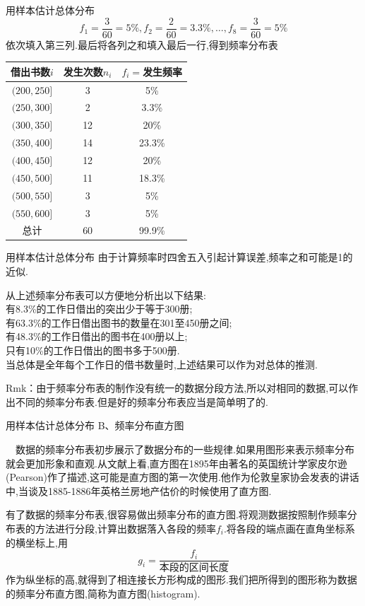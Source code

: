 \begin{frame}{用样本估计总体分布}
\begin{equation*}
f_1 = \frac{3}{60} = 5\%,f_2 =  \frac{2}{60} = 3.3\%,\dots,f_8 =  \frac{3}{60} = 5\%
\end{equation*}
依次填入第三列.最后将各列之和填入最后一行,得到频率分布表

\quad\quad\quad\quad\quad\quad\begin{tabular}{c|c|c}
\hline 借出书数$i$ & 发生次数$n_i$ & $f_i=$发生频率\\
\hline $(200,250]$ & 3 & 5\% \\	
\hline $(250,300]$ & 2 & 3.3\% \\	
\hline $(300,350]$ & 12 & 20\% \\	
\hline $(350,400]$ & 14 & 23.3\% \\	
\hline $(400,450]$ & 12 & 20\% \\	
\hline $(450,500]$ & 11 & 18.3\% \\	
\hline $(500,550]$ & 3 & 5\% \\	
\hline $(550,600]$ & 3 & 5\% \\	
\hline 总计 & 60 & 99.9\% \\
\hline
\end{tabular}
\end{frame}

\begin{frame}{用样本估计总体分布}
由于计算频率时四舍五入引起计算误差,频率之和可能是1的近似.

从上述频率分布表可以方便地分析出以下结果:\\
有8.3\%的工作日借出的突出少于等于300册;\\
有63.3\%的工作日借出图书的数量在301至450册之间;\\
有48.3\%的工作日借出的图书在400册以上;\\
只有10\%的工作日借出的图书多于500册.\\
当总体是全年每个工作日的借书数量时,上述结果可以作为对总体的推测.

Rmk：由于频率分布表的制作没有统一的数据分段方法,所以对相同的数据,可以作出不同的频率分布表.但是好的频率分布表应当是简单明了的.


\end{frame}	

\begin{frame}{用样本估计总体分布}
\alert{B、频率分布直方图}

$\quad$数据的频率分布表初步展示了数据分布的一些规律.如果用图形来表示频率分布就会更加形象和直观.从文献上看,直方图在1895年由著名的英国统计学家皮尔逊(Pearson)作了描述,这可能是直方图的第一次使用.他作为伦敦皇家协会发表的讲话中,当谈及1885-1886年英格兰房地产估价的时候使用了直方图.

有了数据的频率分布表,很容易做出频率分布的直方图.将观测数据按照制作频率分布表的方法进行分段,计算出数据落入各段的频率$f_i$.将各段的端点画在直角坐标系的横坐标上,用
\begin{equation}
g_i = \frac{f_i}{\text{本段的区间长度}}
\end{equation}
作为纵坐标的高,就得到了相连接长方形构成的图形.我们把所得到的图形称为数据的频率分布直方图,简称为\alert{直方图}(histogram).
\end{frame}	

